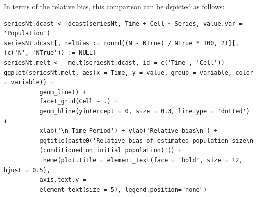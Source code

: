 \documentclass[12pt, a4paper]{article}
\begin{document}
In terms of the relative bias, this comparison can be depicted as follows:
\begin{verbatim}
seriesNt.dcast <- dcast(seriesNt, Time + Cell ~ Series, value.var = 'Population')
seriesNt.dcast[, relBias := round((N - NTrue) / NTrue * 100, 2)][, (c('N', 'NTrue')) := NULL]
seriesNt.melt <-  melt(seriesNt.dcast, id = c('Time', 'Cell'))
ggplot(seriesNt.melt, aes(x = Time, y = value, group = variable, color = variable)) + 
          geom_line() + 
          facet_grid(Cell ~ .) +
          geom_hline(yintercept = 0, size = 0.3, linetype = 'dotted') + 
          xlab('\n Time Period') + ylab('Relative bias\n') +
          ggtitle(paste0('Relative bias of estimated population size\n 
          (conditioned on initial population)')) +
          theme(plot.title = element_text(face = 'bold', size = 12, hjust = 0.5), 
          axis.text.y =
          element_text(size = 5), legend.position="none")
\end{verbatim}
\end{document}
